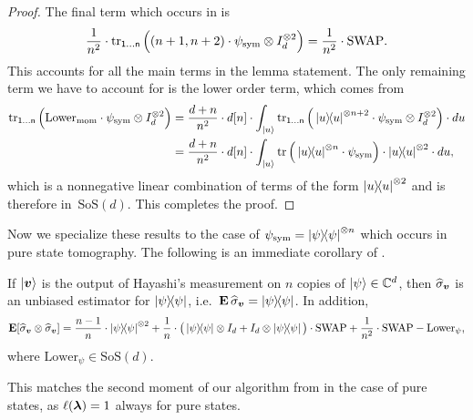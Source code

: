 \documentclass{article}
\newcommand{\symsep}{\mathrm{SoS}}
\newcommand{\swap}{\mathrm{SWAP}}
\newcommand{\reg}[1]{\mathsf{#1}}
\begin{document}
\begin{proof}
    The final term which occurs in  is
    \begin{equation*}
        \frac{1}{n^2} \cdot \tr_{\reg{1}\dots\reg{n}}\Big((n+1, n+2) \cdot \psi_{\mathrm{sym}} \otimes I_d^{\otimes 2}\Big) = \frac{1}{n^2} \cdot \swap.
    \end{equation*}
    This accounts for all the main terms in the lemma statement.
    The only remaining term we have to account for is the lower order term, which comes from
    \begin{align*}
        \tr_{\reg{1}\dots\reg{n}}\Big(\mathrm{Lower}_{\mathrm{mom}} \cdot \psi_{\mathrm{sym}} \otimes I_d^{\otimes 2}\Big)
        &= \frac{d+n}{n^2} \cdot d[n] \cdot \int_{\ket{u}} \tr_{\reg{1}\dots\reg{n}}\Big(\ketbra{u}^{\otimes n+2} \cdot \psi_{\mathrm{sym}} \otimes I_d^{\otimes 2}\Big)\cdot du\\
        &= \frac{d+n}{n^2} \cdot d[n] \cdot \int_{\ket{u}} \tr\Big(\ketbra{u}^{\otimes n} \cdot \psi_{\mathrm{sym}}\Big) \cdot \ketbra{u}^{\otimes 2}\cdot du,
    \end{align*}
    which is a nonnegative linear combination of terms of the form $\ketbra{u}^{\otimes 2}$ and is therefore in~$\symsep(d)$.
    This completes the proof.
\end{proof}

Now we specialize these results to the case of $\psi_{\mathrm{sym}} = \ketbra{\psi}^{\otimes n}$ which occurs in pure state tomography.
The following is an immediate corollary of .

\begin{corollary}\label{cor:gps-moments}
If $\ket{\boldsymbol{v}}$ is the output of Hayashi's measurement on $n$ copies of $\ket{\psi} \in \mathbb C^d$, then $\widehat{\sigma}_{\boldsymbol{v}}$ is an unbiased estimator for $\ketbra{\psi}$, i.e.\ $\mathop{\bf E\/} \widehat{\sigma}_{\boldsymbol{v}} = \ketbra{\psi}$.
In addition,
\begin{equation*}
    \E[\widehat{\sigma}_{\bv}\otimes \widehat{\sigma}_{\bv}] = \frac{n-1}{n} \cdot \ketbra{\psi}^{\otimes 2} + \frac{1}{n} \cdot \big(\ketbra{\psi} \otimes I_d + I_d \otimes \ketbra{\psi}\big) \cdot \swap + \frac{1}{n^2} \cdot \swap-\mathrm{Lower}_{\psi},
    \end{equation*}
    where $\mathrm{Lower}_{\psi} \in \symsep(d)$.
\end{corollary}
\noindent
This matches the second moment of our algorithm from  in the case of pure states, as $\ell(\boldsymbol{\lambda}) = 1$ always for pure states.
\end{document}
